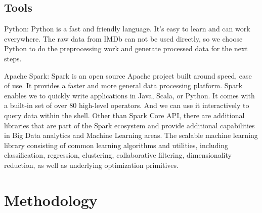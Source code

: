 \documentclass{vldb}
\begin{document}
\subsection{Tools}
\par Python: Python is a fast and friendly language. It’s easy to learn and can work everywhere. The raw data from IMDb can not be used directly, so we choose Python to do the preprocessing work and generate processed data for the next steps.
\par Apache Spark: Spark is an open source Apache project built around speed, ease of use. It provides a faster and more general data processing platform. Spark enables we to quickly write applications in Java, Scala, or Python. It comes with a built-in set of over 80 high-level operators. And we can use it interactively to query data within the shell. Other than Spark Core API, there are additional libraries that are part of the Spark ecosystem and provide additional capabilities in Big Data analytics and Machine Learning areas. The scalable machine learning library consisting of common learning algorithms and utilities, including classification, regression, clustering, collaborative filtering, dimensionality reduction, as well as underlying optimization primitives.

\section{Methodology}
\end{document}
